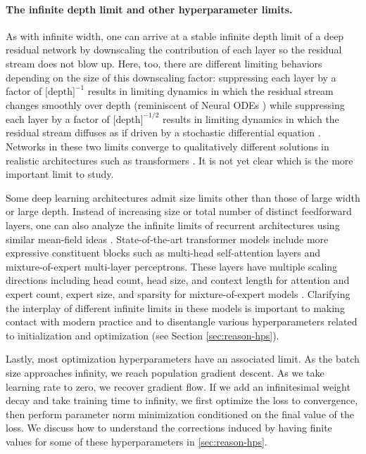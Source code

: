 \paragraph{The infinite depth limit and other hyperparameter limits.}

As with infinite width, one can arrive at a stable infinite depth limit of a deep residual network by downscaling the contribution of each layer so the residual stream does not blow up.
Here, too, there are different limiting behaviors depending on the size of this downscaling factor: suppressing each layer by a factor of $\text{[depth]}^{-1}$ results in limiting dynamics in which the residual stream changes smoothly over depth \citep{bordelon2024infinite, chizat2025hidden, chaintron2026resnets} (reminiscent of Neural ODEs \citep{chen2018neural}) while suppressing each layer by a factor of $\text{[depth]}^{-1/2}$ results in limiting dynamics in which the residual stream diffuses as if driven by a stochastic differential equation \citep{bordelon2023depthwise, yang2023depth}.
Networks in these two limits converge to qualitatively different solutions in realistic architectures such as transformers \citep{dey2025don}.
It is not yet clear which is the more important limit to study.



Some deep learning architectures admit size limits other than those of large width or large depth. Instead of increasing size or total number of distinct feedforward layers, one can also analyze the infinite limits of recurrent architectures using similar mean-field ideas \citep{clark2026structure, bauer2026unified}. State-of-the-art transformer models include more expressive constituent blocks such as multi-head self-attention layers and mixture-of-expert multi-layer perceptrons. These layers have multiple scaling directions including head count, head size, and context length for attention \citep{hron2020infinite,bordelon2024infinite} and expert count, expert size, and sparsity for mixture-of-expert models \citep{pioromu2025moes,jiang2026hyperparameter}.
Clarifying the interplay of different infinite limits in these models is important to making contact with modern practice and to disentangle various hyperparameters related to initialization and optimization (see Section \ref{sec:reason-hps}).

Lastly, most optimization hyperparameters have an associated limit.
As the batch size approaches infinity, we reach population gradient descent.
As we take learning rate to zero, we recover gradient flow.
If we add an infinitesimal weight decay and take training time to infinity, we first optimize the loss to convergence, then perform parameter norm minimization conditioned on the final value of the loss.
We discuss how to understand the corrections induced by having finite values for some of these hyperparameters in \cref{sec:reason-hps}.


